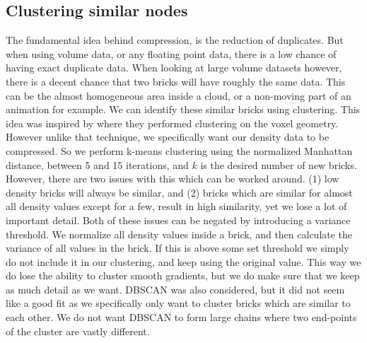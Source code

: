 \subsection{Clustering similar nodes} \label{approach:clustering_similar_nodes}
The fundamental idea behind compression, is the reduction of duplicates. But when using volume data, or any floating point data, there is a low chance of having exact duplicate data. When looking at large volume datasets however, there is a decent chance that two bricks will have roughly the same data. This can be the almost homogeneous area inside a cloud, or a non-moving part of an animation for example. We can identify these similar bricks using clustering. This idea was inspired by \cite{van2020lossy} where they performed clustering on the voxel geometry. However unlike that technique, we specifically want our density data to be compressed. So we perform k-means clustering using the normalized Manhattan distance, between 5 and 15 iterations, and $k$ is the desired number of new bricks. However, there are two issues with this which can be worked around. (1) low density bricks will always be similar, and (2) bricks which are similar for almost all density values except for a few, result in high similarity, yet we lose a lot of important detail. Both of these issues can be negated by introducing a variance threshold. We normalize all density values inside a brick, and then calculate the variance of all values in the brick. If this is above some set threshold we simply do not include it in our clustering, and keep using the original value. This way we do lose the ability to cluster smooth gradients, but we do make sure that we keep as much detail as we want. DBSCAN was also considered, but it did not seem like a good fit as we specifically only want to cluster bricks which are similar to each other. We do not want DBSCAN to form large chains where two end-points of the cluster are vastly different.